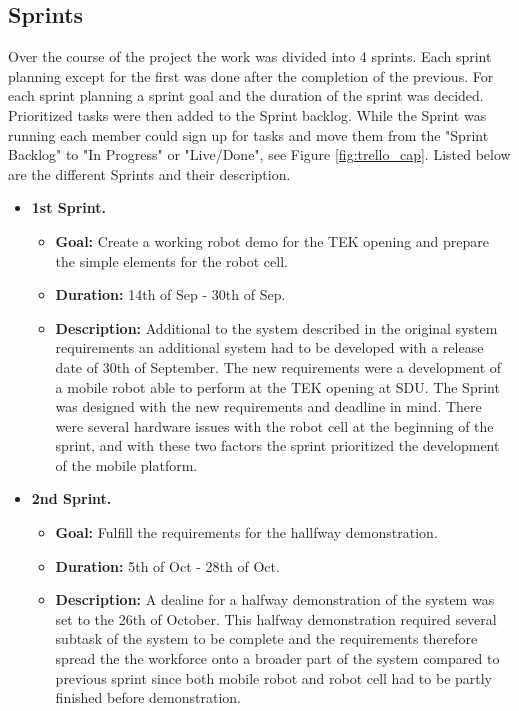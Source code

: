 \subsection{Sprints} \label{sec:sprints}
Over the course of the project the work was divided into 4 sprints. Each sprint planning except for the first was done after the completion of the previous. For each sprint planning a sprint goal and the duration of the sprint was decided. Prioritized tasks were then added to the Sprint backlog. While the Sprint was running each member could sign up for tasks and move them from the "Sprint Backlog" to "In Progress" or "Live/Done", see Figure \ref{fig:trello_cap}. 
Listed below are the different Sprints and their description.

\begin{itemize}
    \item \textbf{1st Sprint.}
    \begin{itemize}
    	\item \textbf{Goal:} Create a working robot demo for the TEK opening and prepare the simple elements for the robot cell.
    	\item \textbf{Duration:} 14th of Sep - 30th of Sep.
    	\item \textbf{Description:} Additional to the system described in the original system requirements an additional system had to be developed with a release date of 30th of September. The new requirements were a development of a mobile robot able to perform at the TEK opening at SDU. The Sprint was designed with the new requirements and deadline in mind. There were several hardware issues with the robot cell at the beginning of the sprint, and with these two factors the sprint prioritized the development of the mobile platform.
	\end{itemize}
	
    \item \textbf{2nd Sprint.}
    \begin{itemize}
    	\item \textbf{Goal:} Fulfill the requirements for the hallfway demonstration.
    	\item \textbf{Duration:} 5th of Oct - 28th of Oct.
    	\item \textbf{Description:} A dealine for a halfway demonstration of the system was set to the 26th of October. This halfway demonstration required several subtask of the system to be complete and the requirements therefore spread the the workforce onto a broader part of the system compared to previous sprint since both mobile robot and robot cell had to be partly finished before demonstration.
	\end{itemize}
	

\end{itemize}
